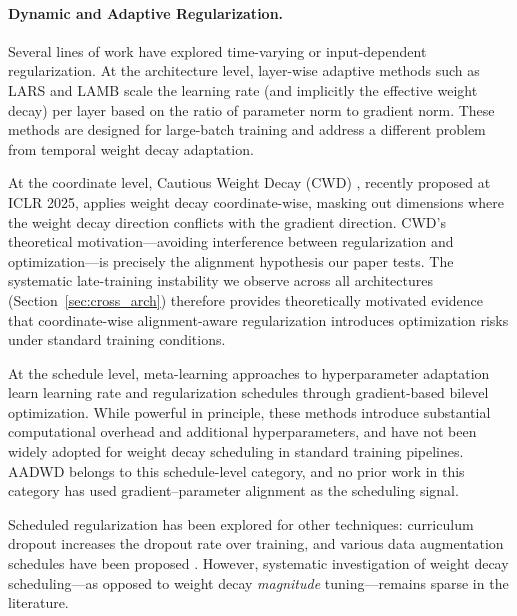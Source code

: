 \documentclass{article}
\begin{document}
\paragraph{Dynamic and Adaptive Regularization.}
Several lines of work have explored time-varying or input-dependent regularization.
At the architecture level, layer-wise adaptive methods such as LARS \citep{you2017large}
and LAMB \citep{you2020large} scale the learning rate (and implicitly the effective
weight decay) per layer based on the ratio of parameter norm to gradient norm.
These methods are designed for large-batch training and address a different problem
from temporal weight decay adaptation.

At the coordinate level, Cautious Weight Decay (CWD) \citep{liu2025cautious},
recently proposed at ICLR 2025, applies weight decay coordinate-wise, masking out
dimensions where the weight decay direction conflicts with the gradient direction.
CWD's theoretical motivation---avoiding interference between regularization and
optimization---is precisely the alignment hypothesis our paper tests.
The systematic late-training instability we observe across all architectures
(Section~\ref{sec:cross_arch}) therefore provides theoretically motivated evidence
that coordinate-wise alignment-aware regularization introduces optimization risks
under standard training conditions.

At the schedule level, meta-learning approaches to hyperparameter adaptation
\citep{baydin2018online, franceschi2018bilevel} learn learning rate and regularization
schedules through gradient-based bilevel optimization.
While powerful in principle, these methods introduce substantial computational
overhead and additional hyperparameters, and have not been widely adopted for weight
decay scheduling in standard training pipelines.
AADWD belongs to this schedule-level category, and no prior work in this category
has used gradient--parameter alignment as the scheduling signal.

Scheduled regularization has been explored for other techniques: curriculum dropout
\citep{morerio2017curriculum} increases the dropout rate over training, and various
data augmentation schedules have been proposed \citep{cubuk2020randaugment}.
However, systematic investigation of weight decay scheduling---as opposed to weight
decay \emph{magnitude} tuning---remains sparse in the literature.
\end{document}
